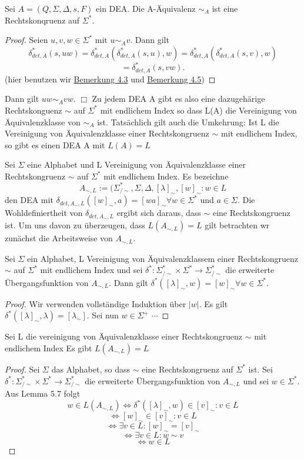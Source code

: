 Sei $A = (Q, \Sigma, \Delta, s, F)$ ein DEA. Die A-Äquivalenz $\sim_{A}$ ist eine Rechtskonqruenz auf $\Sigma^{*}$.
\begin{proof}
  Seien $u, v, w \in \Sigma^{*}$ mit $u \sim_{A} v$. Dann gilt 
  \[\delta_{det, A}^{*}(s, uw) = \delta_{det,A}^{*}(\delta_{det,A}^{*}(s, u), w) = \delta_{det,A}^{*}(\delta_{det,A}^{*}(s,v), w)\]
  \[= \delta_{det,A}^{*}(s, vw).\] (hier benutzen wir \hyperref[subsec:4.3]{Bemerkung 4.3} und \hyperref[subsec:4.5]{Bemerkung 4.5})    
\end{proof} Dann gilt $uw\sim_{A}vw.$
$\Box $
Zu jedem DEA A gibt es also eine dazugehärige Rechtskonguenz $\sim$ auf $\Sigma^{*}$ mit endlichem Index so dass L(A) die Vereinigung von Äquivalenzklasse von $\sim_{A}$ ist. Tatsächlich gilt auch die Umkehrung: Ist L die Vereinigung von Äquivalenzklasse einer Rechtskongruenz $\sim$ mit endlichem Index, so gibt es einen DEA A mit $L(A) = L$

 Sei $\Sigma$ eine Alphabet und L Vereinigung von Äquivalenzklasse einer Rechtskongruenz $\sim$ auf $\Sigma^{*}$ mit endlichem Index. Es bezeichne
\[A_{\sim , L} := (\Sigma^{*}_{/\sim}, \Sigma, \Delta, [\lambda]_{\sim}, {[w]_{\sim} : w \in L}\]
den DEA mit $\delta_{det, A_{\sim}, L}([w]_{\sim}, a) = [wa]_{\sim} \forall w \in \Sigma^{*}$ und $a \in \Sigma$. Die Wohldefiniertheit von $\delta_{det, A_{\sim}, L}$ ergibt sich daraus, dass $\sim$ eine Rechtskongruenz ist. Um uns davon zu überzeugen, dass $L(A_{\sim, L}) = L$ gilt betrachten wr zunächst die Arbeitsweise von $A_{\sim, L}$.

 Sei $\Sigma$ ein Alphabet, L Vereinigung von Äquivalenzklassem einer Rechtskongruenz $\sim$ auf $\Sigma^{*}$ mit endlichem Index und sei $\delta^{*} : \Sigma^{*}_{/\sim} \times \Sigma^{*} \rightarrow \Sigma^{*}_{/\sim}$ die erweiterte Übergangsfunktion von $A_{\sim, L}$. Dann gilt $\delta^{*}([\lambda]_{\sim}, w) = [w]_{\sim} \forall w \in \Sigma^{*}$. 
\begin{proof}
  Wir verwenden vollständige Induktion über $|w|$. Es gilt $\delta^{*}([\lambda]_{\sim}, \lambda) = [\lambda_{\sim}]$. Sei nun $w \in \Sigma^{+}$ $\cdots$  
\end{proof}

 Sei L die vereinigung von Äquivalenzklasse einer Rechtskongruenz $\sim$ mit endlichem Index Es gibt $L(A_{\sim, L}) = L$ 
\begin{proof}
  Sei $\Sigma$ das Alphabet, so dass $\sim$ eine Rechtskongruenz auf $\Sigma^{*}$ ist. Sei $\delta^{*} : \Sigma^{*}_{/\sim} \times \Sigma^{*} \rightarrow \Sigma^{*}_{/\sim}$ die erweiterte Übergangsfunktion von $A_{\sim, L}$ und sei $w \in \Sigma^{*}$. Aus Lemma 5.7 folgt 
  \[w \in L(A_{\sim, L}) \Leftrightarrow \delta^{*}([\lambda]_{\sim}, w) \in {[v]_{\sim} : v \in L}\]
  \[\Leftrightarrow [w]_{\sim} \in {[v]_{\sim} : v\in L}\]
  \[\Leftrightarrow \exists v \in L : [w]_{\sim} = [v]_{\sim}\]
  \[\Leftrightarrow \exists v \in L : w \sim v\]
  \[\Leftrightarrow w \in L\]
\end{proof}

